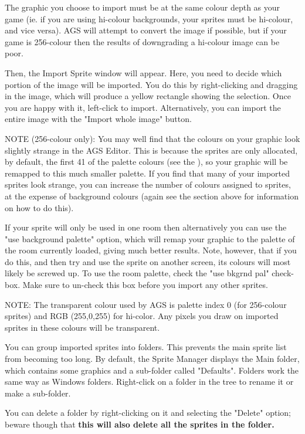 The graphic you choose to import must be at the same colour depth as your game
(ie. if you are using hi-colour backgrounds, your sprites must be hi-colour,
and vice versa). AGS will attempt to convert the image if possible, but if
your game is 256-colour then the results of downgrading a hi-colour image
can be poor.

Then, the Import Sprite window will appear. Here, you need to decide which portion
of the image will be imported. You do this by right-clicking and dragging in the
image, which will produce a yellow rectangle showing the selection. Once you are
happy with it, left-click to import.
Alternatively, you can import the entire image with the "Import whole image" button.

\it{NOTE (256-colour only):
You may well find that the colours on your graphic look slightly strange in
the AGS Editor. This is because the sprites are only allocated, by default,
the first 41 of the palette colours (see the ), so
your graphic will be remapped to this much smaller palette. If you find that
many of your imported sprites look strange, you can increase the number of
colours assigned to sprites, at the expense of background colours (again see
the section above for information on how to do this).

If your sprite will only be used in one room then alternatively you can
use the "use background palette" option, which will remap your graphic to
the palette of the room currently loaded, giving much better results. Note,
however, that if you do this, and then try and use the sprite on another
screen, its colours will most likely be screwed up. To use the room palette,
check the "use bkgrnd pal" check-box. Make sure to un-check this box before
you import any other sprites.}

NOTE: The transparent colour used by AGS is palette index 0 (for 256-colour
sprites) and RGB (255,0,255) for hi-color. Any pixels you draw on imported
sprites in these colours will be transparent.

You can group imported sprites into folders. This prevents the main sprite
list from becoming too long. By default, the Sprite Manager displays the
Main folder, which contains some graphics and a sub-folder called "Defaults".
Folders work the same way as Windows folders. Right-click on a folder in the
tree to rename it or make a sub-folder.

You can delete a folder by right-clicking on it and selecting the "Delete"
option; beware though that \bf{this will also delete all the sprites in the folder}.

